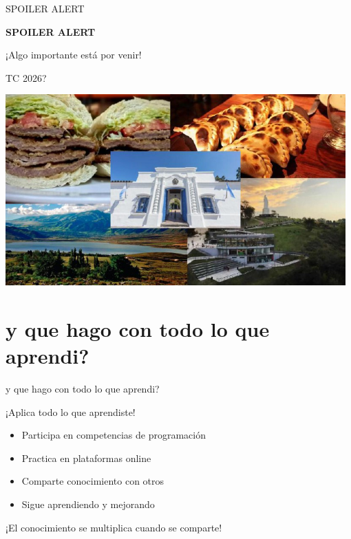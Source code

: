 \documentclass{beamer}
\begin{document}
\begin{frame}{SPOILER ALERT}
\begin{center}
\Huge
\textbf{SPOILER ALERT}

\vspace{2cm}

\Large
¡Algo importante está por venir!
\end{center}
\end{frame}

\begin{frame}{TC 2026?}
\begin{center}
\includegraphics[width=0.98\textwidth,height=0.9\textheight,keepaspectratio]{img/tucu.jpeg}
\end{center}
\end{frame}



\section{y que hago con todo lo que aprendi?}

\begin{frame}{y que hago con todo lo que aprendi?}
\begin{center}
\Large
¡Aplica todo lo que aprendiste!

\vspace{1cm}

\begin{itemize}
\item Participa en competencias de programación
\item Practica en plataformas online
\item Comparte conocimiento con otros
\item Sigue aprendiendo y mejorando
\end{itemize}

\vspace{1cm}

¡El conocimiento se multiplica cuando se comparte!
\end{center}
\end{frame}
\end{document}
